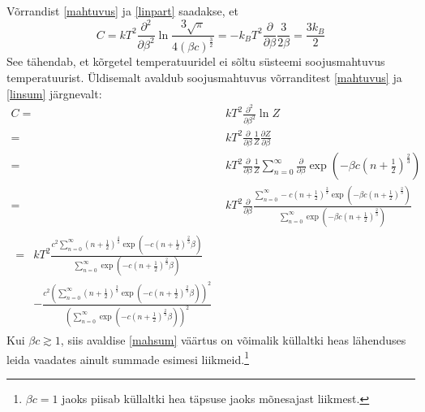 \documentclass{trkut}%
\begin{document}
Võrrandist \eqref{mahtuvus} ja \eqref{linpart} saadakse, et
\begin{equation}
    C=kT^2 \frac{\partial^2}{\partial \beta^2} \ln \frac{3\sqrt{\pi}}{4(\beta c)^\frac{3}{2}}=-k_BT^2\frac{\partial}{\partial \beta} \frac{3}{2\beta}=\frac{3k_B}{2}
\end{equation}
See tähendab, et kõrgetel temperatuuridel ei sõltu süsteemi soojusmahtuvus temperatuurist.
Üldisemalt avaldub soojusmahtuvus võrranditest \eqref{mahtuvus} ja \eqref{linsum} järgnevalt:
\begin{align}
    C={}&kT^2 \frac{\partial^2}{\partial \beta^2} \ln Z \nonumber \\
    ={}&kT^2\frac{\partial}{\partial \beta}\frac{1}{Z} \frac{\partial Z}{\partial \beta} \nonumber \\
    ={}&kT^2\frac{\partial}{\partial \beta}\frac{1}{Z} \sum_{n=0}^{\infty} \frac{\partial}{\partial \beta} \exp \left( -\beta c \left(n+\frac{1}{2}\right)^\frac{2}{3} \right) \nonumber \\
    ={}&kT^2\frac{\partial}{\partial \beta} \frac{\sum_{n=0}^{\infty} -c\left(n+\frac{1}{2}\right)^\frac{2}{3} \exp \left( -\beta c \left(n+\frac{1}{2}\right)^\frac{2}{3} \right)}{\sum_{n=0}^{\infty} \exp \left( -\beta c \left(n+\frac{1}{2}\right)^\frac{2}{3} \right)} \nonumber \\
    \begin{split}\label{mahsum}
        ={}&kT^2 \frac{c^2 \sum_{n=0}^\infty \left( n+\frac{1}{2}\right)^\frac{4}{3} \exp \left( -c \left( n+\frac{1}{2} \right)^\frac{2}{3} \beta \right) }{\sum_{n=0}^\infty {{\exp}\left( -c {{\left( n+\frac{1}{2}\right) }^{\frac{2}{3}}} \beta \right)}}  \\
        & - \frac{c^2 \left( \sum_{n=0}^{\infty }{{{\left( n+\frac{1}{2}\right) }^{\frac{2}{3}}} {{ \exp}\left( -c {{\left( n+\frac{1}{2}\right) }^{\frac{2}{3}}} \beta \right)}}\right)^{2}}{{{\left( \sum_{n=0}^{\infty }{ {{\exp}\left( -c {{\left( n+\frac{1}{2}\right) }^{\frac{2}{3}}} \beta \right)}}\right) }^{2}}}
    \end{split}
\end{align}
Kui $\beta c \gtrsim 1$, siis avaldise \eqref{mahsum} väärtus on võimalik küllaltki heas lähenduses leida vaadates ainult summade esimesi liikmeid.\footnote{$\beta c =1$ jaoks piisab küllaltki hea täpsuse jaoks mõnesajast liikmest.}
\end{document}
